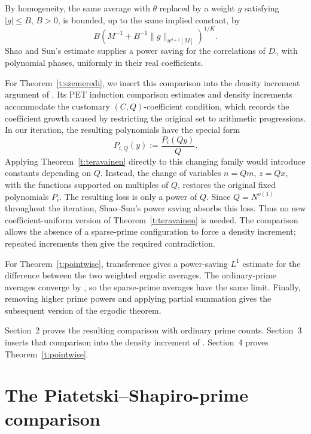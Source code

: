 \documentclass[12pt]{amsart}
\newcommand{\1}{\mathbf 1}
\begin{document}
By homogeneity, the same average with $\theta$ replaced by a weight
$g$ satisfying $|g|\leq B$, $B>0$, is bounded, up to the same implied
constant, by
\begin{equation}\label{e:scaled-vn}
 B\left(M^{-1}+B^{-1}\|g\|_{u^{d+1}[M]}\right)^{1/K}.
\end{equation}
Shao and Sun's estimate \cite[Theorem~2.1]{ShaoSun} supplies a power
saving for the correlations of $D_\gamma$ with polynomial phases,
uniformly in their real coefficients. 

For Theorem~\ref{t:szemeredi}, we insert this comparison into the
density increment argument of \cite{KMTT}. Its PET induction comparison
estimates and density increments accommodate the customary
$(C,Q)$-coefficient condition, which records the coefficient growth
caused by restricting the original set to arithmetic progressions. In our iteration,
the resulting polynomials have the special form
\begin{equation}\label{e:rescaled-polynomial}
 P_{i,Q}(y):=\frac{P_i(Qy)}Q.
\end{equation}
Applying Theorem~\ref{t:teravainen} directly to this changing family
would introduce constants depending on $Q$. Instead, the change of
variables $n=Qm$, $z=Qx$, with the functions supported on multiples
of $Q$, restores the original fixed polynomials $P_i$.
The resulting loss is only a power of $Q$. Since $Q=N^{o(1)}$
throughout the iteration, Shao--Sun's power saving absorbs this
loss. Thus no new coefficient-uniform version of
Theorem~\ref{t:teravainen} is needed. The comparison allows the
absence of a sparse-prime configuration to force a density increment;
repeated increments then give the required contradiction.

For Theorem~\ref{t:pointwise}, transference gives a power-saving
$L^1$ estimate for the difference between the two weighted ergodic
averages.  The ordinary-prime averages
converge by \cite[Theorem~1.1]{MirekWanWright}, so the sparse-prime
averages have the same limit. Finally, removing higher prime powers
and applying partial summation gives the subsequent version of the ergodic theorem. 


Section~2 proves the resulting comparison with ordinary prime counts.
Section~3 inserts that comparison into the density increment of
\cite{KMTT}.  Section~4 proves Theorem~\ref{t:pointwise}.

\section{The Piatetski--Shapiro-prime comparison}
\end{document}
